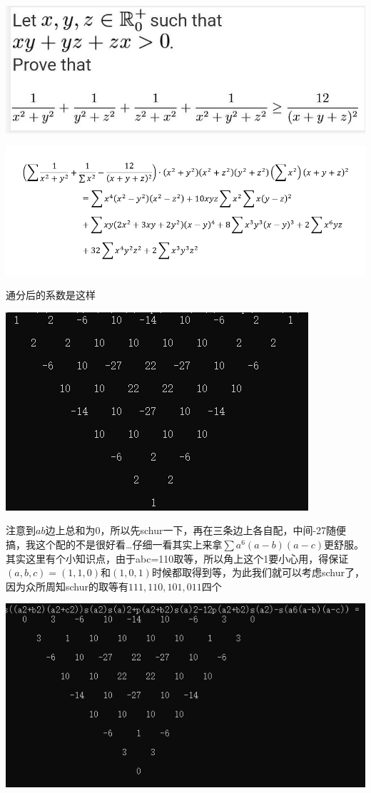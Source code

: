 \documentclass[UTF8]{ctexart}
\begin{document}
\subsection{}
\begin{center}
	\includegraphics[width=0.6\linewidth]{a01}
\end{center}
\begin{center}
	\includegraphics[width=0.7\linewidth]{a02}
\end{center}
通分后的系数是这样
\begin{center}
	\includegraphics[width=0.7\linewidth]{a03}
\end{center}
注意到$ ab $边上总和为0，所以先schur一下，再在三条边上各自配，中间-27随便搞，我这个配的不是很好看…仔细一看其实上来拿$  \displaystyle \sum a^{6}(a-b)(a-c) $更舒服。其实这里有个小知识点，由于abc=110取等，所以角上这个1要小心用，得保证$ (a,b,c)=(1,1,0) $和$ (1,0,1) $时候都取得到等，为此我们就可以考虑schur了，因为众所周知schur的取等有$ 111,110,101,011 $四个
\begin{center}
	\includegraphics[width=0.7\linewidth]{a04}
\end{center}
\end{document}
